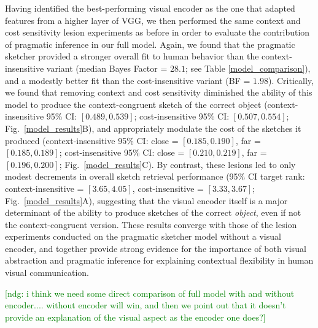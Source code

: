 \documentclass[9pt,twocolumn,twoside]{pnas-new}
\newcommand{\ndg}[1]{\textcolor{Green}{[ndg: #1]}}
\begin{document}
Having identified the best-performing visual encoder as the one that adapted features from a higher layer of VGG, we then performed the same context and cost sensitivity lesion experiments as before in order to evaluate the contribution of pragmatic inference in our full model. 
Again, we found that the pragmatic sketcher provided a stronger overall fit to human behavior than the context-insensitive variant (median Bayes Factor = $28.1$; see Table \ref{model_comparison}), and a modestly better fit than the cost-insensitive variant (BF = $1.98$). 
Critically, we found that removing context and cost sensitivity diminished the ability of this model to produce the context-congruent sketch of the correct object (context-insensitive 95\% CI: $[0.489, 0.539]$; cost-insensitive 95\% CI: $[0.507, 0.554]$; Fig.~\ref{model_results}B), and appropriately modulate the cost of the sketches it produced (context-insensitive 95\% CI: close = $[0.185, 0.190]$, far = $[0.185, 0.189]$; cost-insensitive 95\% CI: close = $[0.210, 0.219]$, far = $[0.196, 0.200]$; Fig.~\ref{model_results}C). 
By contrast, these lesions led to only modest decrements in overall sketch retrieval performance (95\% CI target rank: context-insensitive = $[3.65, 4.05]$, cost-insensitive = $[3.33, 3.67]$;  Fig.~\ref{model_results}A), suggesting that the visual encoder itself is a major determinant of the ability to produce sketches of the correct \textit{object}, even if not the context-congruent version.
These results converge with those of the lesion experiments conducted on the pragmatic sketcher model without a visual encoder, and together provide strong evidence for the importance of both visual abstraction and pragmatic inference for explaining contextual flexibility in human visual communication. 

\ndg{i think we need some direct comparison of full model with and without encoder.... without encoder will win, and then we point out that it doesn't provide an explanation of the visual aspect as the encoder one does?}
\end{document}
